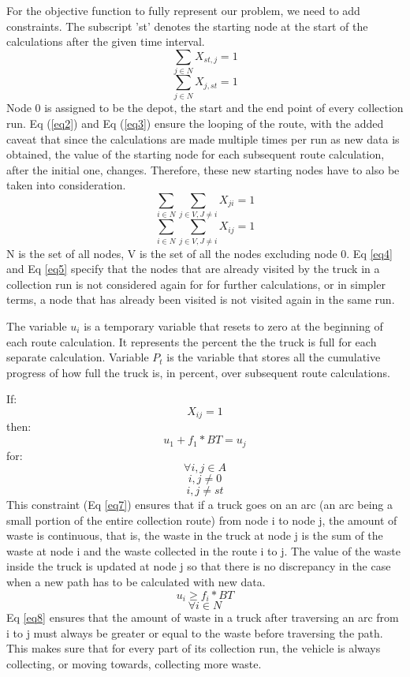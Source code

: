 \documentclass[12pt]{article}
\begin{document}
For the objective function to fully represent our problem, we need to add constraints. The subscript 'st' denotes the starting node at the start of the calculations after the given time interval.
\begin{equation}\label{eq2}
    \sum_{j\in N}X_{st,j}=1
\end{equation}
\begin{equation}\label{eq3}
    \sum_{j\in N}X_{j,st}=1
\end{equation}
Node 0 is assigned to be the depot, the start and the end point of every collection run. Eq (\ref{eq2}) and Eq (\ref{eq3}) ensure the looping of the route, with the added caveat that since the calculations are made multiple times per run as new data is obtained, the value of the starting node for each subsequent route calculation, after the initial one, changes. Therefore, these new starting nodes have to also be taken into consideration.
\begin{equation}\label{eq4}
    \sum_{i\in N}\sum_{j\in V, J\ne i} X_{ji}=1
\end{equation}
\begin{equation}\label{eq5}
    \sum_{i\in N}\sum_{j\in V, J\ne i} X_{ij}=1
\end{equation}
N is the set of all nodes, V is the set of all the nodes excluding node 0. Eq \eqref{eq4}
and Eq \eqref{eq5} specify that the nodes that are already visited by the truck in a collection run is not considered again for for further calculations, or in simpler terms, a node that has already been visited is not visited again in the same run.

The variable $u_i$ is a temporary variable that resets to zero at the beginning of each route calculation. It represents the percent the the truck is full for each separate calculation. Variable $P_t$ is the variable that stores all the cumulative progress of how full the truck is, in percent, over subsequent route calculations.

If:
$$ X_{ij}=1$$
then:
\begin{equation}\label{eq7}
    u_1+f_1*BT =u_j
\end{equation}
for: 
$$ \forall i,j \in A$$
$$ i,j\ne 0$$
$$ i,j \ne st $$
This constraint (Eq \eqref{eq7}) ensures that if a truck goes on an arc (an arc being a small portion of the entire collection route) from node i to node j, the amount of waste is continuous, that is, the waste in the truck at node j is the sum of the waste at node i and the waste collected in the route i to j. The value of the waste inside the truck is updated at node j so that there is no discrepancy in the case when a new path has to be calculated with new data.
\begin{equation}\label{eq8}
    u_i\ge f_i*BT
\end{equation}
$$  \forall i\in N$$
Eq \eqref{eq8} ensures that the amount of waste in a truck after traversing an arc from i to j must always be greater or equal to the waste before traversing the path. This makes sure that for every part of its collection run, the vehicle is always collecting, or moving towards, collecting more waste.
\end{document}
